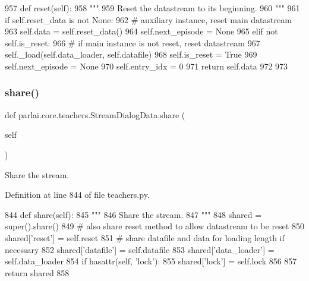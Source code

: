 \begin{DoxyCode}
957     \textcolor{keyword}{def }reset(self):
958         \textcolor{stringliteral}{"""}
959 \textcolor{stringliteral}{        Reset the datastream to its beginning.}
960 \textcolor{stringliteral}{        """}
961         \textcolor{keywordflow}{if} self.reset\_data \textcolor{keywordflow}{is} \textcolor{keywordflow}{not} \textcolor{keywordtype}{None}:
962             \textcolor{comment}{# auxiliary instance, reset main datastream}
963             self.data = self.reset\_data()
964             self.next\_episode = \textcolor{keywordtype}{None}
965         \textcolor{keywordflow}{elif} \textcolor{keywordflow}{not} self.is\_reset:
966             \textcolor{comment}{# if main instance is not reset, reset datastream}
967             self.\_load(self.data\_loader, self.datafile)
968             self.is\_reset = \textcolor{keyword}{True}
969             self.next\_episode = \textcolor{keywordtype}{None}
970         self.entry\_idx = 0
971         \textcolor{keywordflow}{return} self.data
972 
973 
\end{DoxyCode}
\mbox{\label{classparlai_1_1core_1_1teachers_1_1StreamDialogData_a6bb0ef8ed4a3360184f715e8fab9b3aa}} 
\subsubsection{\texorpdfstring{share()}{share()}}
{\footnotesize\ttfamily def parlai.\+core.\+teachers.\+Stream\+Dialog\+Data.\+share (\begin{DoxyParamCaption}\item[{}]{self }\end{DoxyParamCaption})}

\begin{DoxyVerb}Share the stream.
\end{DoxyVerb}
 

Definition at line 844 of file teachers.\+py.


\begin{DoxyCode}
844     \textcolor{keyword}{def }share(self):
845         \textcolor{stringliteral}{"""}
846 \textcolor{stringliteral}{        Share the stream.}
847 \textcolor{stringliteral}{        """}
848         shared = super().share()
849         \textcolor{comment}{# also share reset method to allow datastream to be reset}
850         shared[\textcolor{stringliteral}{'reset'}] = self.reset
851         \textcolor{comment}{# share datafile and data for loading length if necessary}
852         shared[\textcolor{stringliteral}{'datafile'}] = self.datafile
853         shared[\textcolor{stringliteral}{'data\_loader'}] = self.data\_loader
854         \textcolor{keywordflow}{if} hasattr(self, \textcolor{stringliteral}{'lock'}):
855             shared[\textcolor{stringliteral}{'lock'}] = self.lock
856 
857         \textcolor{keywordflow}{return} shared
858 
\end{DoxyCode}


